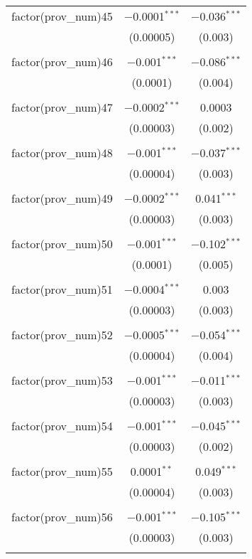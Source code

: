 \begin{table}[ht!]
\begin{tabular}{@{\extracolsep{5pt}}lcc}
 factor(prov\_num)45 & $-$0.0001$^{***}$ & $-$0.036$^{***}$ \\ 
  & (0.00005) & (0.003) \\ 
  & & \\ 
 factor(prov\_num)46 & $-$0.001$^{***}$ & $-$0.086$^{***}$ \\ 
  & (0.0001) & (0.004) \\ 
  & & \\ 
 factor(prov\_num)47 & $-$0.0002$^{***}$ & 0.0003 \\ 
  & (0.00003) & (0.002) \\ 
  & & \\ 
 factor(prov\_num)48 & $-$0.001$^{***}$ & $-$0.037$^{***}$ \\ 
  & (0.00004) & (0.003) \\ 
  & & \\ 
 factor(prov\_num)49 & $-$0.0002$^{***}$ & 0.041$^{***}$ \\ 
  & (0.00003) & (0.003) \\ 
  & & \\ 
 factor(prov\_num)50 & $-$0.001$^{***}$ & $-$0.102$^{***}$ \\ 
  & (0.0001) & (0.005) \\ 
  & & \\ 
 factor(prov\_num)51 & $-$0.0004$^{***}$ & 0.003 \\ 
  & (0.00003) & (0.003) \\ 
  & & \\ 
 factor(prov\_num)52 & $-$0.0005$^{***}$ & $-$0.054$^{***}$ \\ 
  & (0.00004) & (0.004) \\ 
  & & \\ 
 factor(prov\_num)53 & $-$0.001$^{***}$ & $-$0.011$^{***}$ \\ 
  & (0.00003) & (0.003) \\ 
  & & \\ 
 factor(prov\_num)54 & $-$0.001$^{***}$ & $-$0.045$^{***}$ \\ 
  & (0.00003) & (0.002) \\ 
  & & \\ 
 factor(prov\_num)55 & 0.0001$^{**}$ & 0.049$^{***}$ \\ 
  & (0.00004) & (0.003) \\ 
  & & \\ 
 factor(prov\_num)56 & $-$0.001$^{***}$ & $-$0.105$^{***}$ \\ 
  & (0.00003) & (0.003) \\ 
  & & \\ 

\end{tabular}
\end{table}
